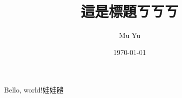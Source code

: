 \documentclass{article}
\title{這是標題ㄎㄎㄎ}
\author{Mu Yu}
\date{\today}
\begin{document}
	\maketitle
	Bello, world!娃娃體
\end{document}
